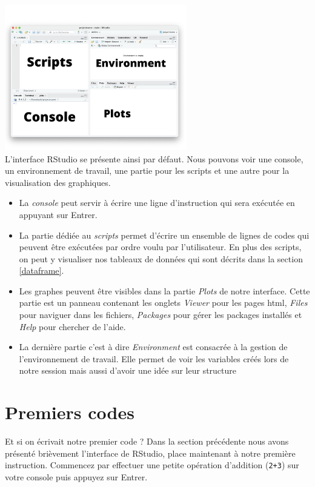 \documentclass[
]{book}
\providecommand{\tightlist}{%
  \setlength{\itemsep}{0pt}\setlength{\parskip}{0pt}}
\begin{document}
\includegraphics[width=3.125in,height=\textheight]{Console.png}\\
L'interface RStudio se présente ainsi par défaut. Nous pouvons voir une console, un environnement de travail, une partie pour les scripts et une autre pour la visualisation des graphiques.

\begin{itemize}
\tightlist
\item
  La \emph{console} peut servir à écrire une ligne d'instruction qui sera exécutée en appuyant sur Entrer.\\
\item
  La partie dédiée au \emph{scripts} permet d'écrire un ensemble de lignes de codes qui peuvent être exécutées par ordre voulu par l'utilisateur. En plus des scripts, on peut y visualiser nos tableaux de données qui sont décrits dans la section \ref{dataframe}.\\
\item
  Les graphes peuvent être visibles dans la partie \emph{Plots} de notre interface. Cette partie est un panneau contenant les onglets \emph{Viewer} pour les pages html, \emph{Files} pour naviguer dans les fichiers, \emph{Packages} pour gérer les packages installés et \emph{Help} pour chercher de l'aide.\\
\item
  La dernière partie c'est à dire \emph{Environment} est consacrée à la gestion de l'environnement de travail. Elle permet de voir les variables créés lors de notre session mais aussi d'avoir une idée sur leur structure
\end{itemize}

\hypertarget{firstcode}{%
\section{Premiers codes}\label{firstcode}}

Et si on écrivait notre premier code ?
Dans la section précédente nous avons présenté brièvement l'interface de RStudio, place maintenant à notre première instruction. Commencez par effectuer une petite opération d'addition (\texttt{2+3}) sur votre console puis appuyez sur Entrer.
\end{document}
